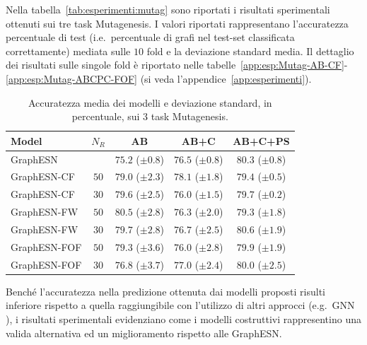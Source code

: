 Nella tabella~\vref{tab:esperimenti:mutag} sono riportati i risultati sperimentali ottenuti sui tre task Mutagenesis.
I valori riportati rappresentano l'accuratezza percentuale di test (i.e.\ percentuale di grafi nel test-set classificata correttamente) mediata sulle $10$ fold e la deviazione standard media. Il dettaglio dei risultati sulle singole fold è riportato nelle tabelle~\ref{app:esp:Mutag-AB-CF}-\ref{app:esp:Mutag-ABCPC-FOF} (si veda l'appendice~\vref{app:esperimenti}).
\begin{table}[tbp]
\small
\caption[Accuratezza media su Mutagenesis]{Accuratezza media dei modelli e deviazione standard, in percentuale, sui 3 task Mutagenesis.}
\label{tab:esperimenti:mutag} 
\centering	
\begin{tabular}{l*{4}{c}}
\toprule
Model 		 & $N_R$& AB				  & AB+C			   & AB+C+PS	\\
\midrule
GraphESN 	 & 		& $75.2$ ($\pm 0.8$) & $76.5$ ($\pm 0.8$) & $80.3$ ($\pm 0.8$) \\
GraphESN-CF  & $50$ & $79.0$ ($\pm 2.3$) & $78.1$ ($\pm 1.8$) & $79.4$ ($\pm 0.5$) \\
GraphESN-CF  & $30$ & $79.6$ ($\pm 2.5$) & $76.0$ ($\pm 1.5$) & $79.7$ ($\pm 0.2$) \\
GraphESN-FW  & $50$ & $80.5$ ($\pm 2.8$) & $76.3$ ($\pm 2.0$) & $79.3$ ($\pm 1.8$) \\
GraphESN-FW  & $30$ & $79.7$ ($\pm 2.8$) & $76.7$ ($\pm 2.5$) & $80.6$ ($\pm 1.9$) \\
GraphESN-FOF & $50$ & $79.3$ ($\pm 3.6$) & $76.0$ ($\pm 2.8$) & $79.9$ ($\pm 1.9$) \\
GraphESN-FOF & $30$ & $76.8$ ($\pm 3.7$) & $77.0$ ($\pm 2.4$) & $80.0$ ($\pm 2.5$) \\
\bottomrule
\end{tabular}
\end{table}
Benché l'accuratezza nella predizione ottenuta dai modelli proposti risulti inferiore rispetto a quella raggiungibile con l'utilizzo di altri approcci (e.g.\ GNN \cite{Scarselli:GNN}), i risultati sperimentali evidenziano come i modelli costruttivi rappresentino una valida alternativa ed un miglioramento rispetto alle GraphESN.

